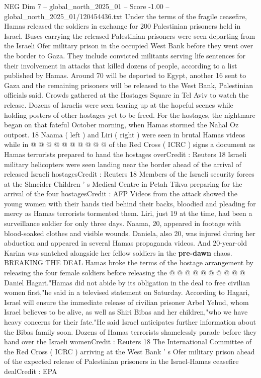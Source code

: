 \begin{textsample}{NEG Dim 7 – global\_north\_2025\_01 – Score -1.00 – global\_north\_2025\_01/120454436.txt}  \label{ex:f7_neg_180}
Under the terms of the fragile ceasefire, Hamas released the soldiers in exchange for 200 Palestinian prisoners held in Israel.
Buses carrying the released Palestinian prisoners were seen departing from the Israeli Ofer military prison in the occupied West Bank before they went over the border to Gaza.
They include convicted militants serving life sentences for their involvement in attacks that killed dozens of people, according to a list published by Hamas.
Around 70 will be deported to Egypt, another 16 sent to Gaza and the remaining prisoners will be released to the West Bank, Palestinian officials said.
Crowds gathered at the Hostages Square in Tel Aviv to watch the release.
Dozens of Israelis were seen tearing up at the hopeful scenes while holding posters of other hostages yet to be freed.
For the hostages, the nightmare began on that fateful October morning, when Hamas stormed the Nahal Oz outpost. 18 Naama ( left ) and Liri ( right ) were seen in brutal Hamas videos while in @ @ @ @ @ @ @ @ @ @ of the Red Cross ( ICRC ) signs a document as Hamas terrorists prepared to hand the hostages overCredit : Reuters 18 Israeli military helicopters were seen landing near the border ahead of the arrival of released Israeli hostagesCredit : Reuters 18 Members of the Israeli security forces at the Shneider Children ' s Medical Centre in Petah Tikva preparing for the arrival of the four hostagesCredit : AFP Videos from the attack showed the young women with their hands tied behind their backs, bloodied and pleading for mercy as Hamas terrorists tormented them.
Liri, just 19 at the time, had been a surveillance soldier for only three days.
Naama, 20, appeared in footage with blood-soaked clothes and visible wounds.
Daniela, also 20, was injured during her abduction and appeared in several Hamas propaganda videos.
And 20-year-old Karina was snatched alongside her fellow soldiers in the \textbf{pre-dawn} chaos.
BREAKING THE DEAL Hamas broke the terms of the hostage arrangement by releasing the four female soldiers before releasing the @ @ @ @ @ @ @ @ @ @ Daniel Hagari."Hamas did not abide by its obligation in the deal to free civilian women first,"he said in a televised statement on Saturday.
According to Hagari, Israel will ensure the immediate release of civilian prisoner Arbel Yehud, whom Israel believes to be alive, as well as Shiri Bibas and her children,"who we have heavy concerns for their fate."He said Israel anticipates further information about the Bibas family soon.
Dozens of Hamas terrorists shamelessly parade before they hand over the Israeli womenCredit : Reuters 18 The International Committee of the Red Cross ( ICRC ) arriving at the West Bank ' s Ofer military prison ahead of the expected release of Palestinian prisoners in the Israel-Hamas ceasefire dealCredit : EPA

\end{textsample}
